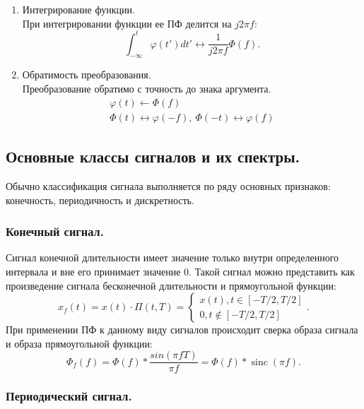 \documentclass[a4paper,14pt]{extarticle}
\DeclareMathOperator{\sinc}{sinc}
\begin{document}
\begin{enumerate}
\item Интегрирование функции. \\ При интегрировании функции ее ПФ делится на $j 2 \pi f$:
\begin{equation*}
\int_{-\infty}^{t} \varphi(t') dt' \leftrightarrow \frac{1}{j 2 \pi f} \Phi (f).
\end{equation*}

\item Обратимость преобразования. \\ Преобразование обратимо с точность до знака аргумента. 
\begin{gather*}
\varphi(t) \leftarrow \Phi (f) \\ \Phi(t) \leftrightarrow \varphi (-f), ~ \Phi(-t) \leftrightarrow \varphi(f)
\end{gather*}

\end{enumerate}  


\subsection{Основные классы сигналов и их спектры.}

Обычно классификация сигнала выполняется по ряду основных признаков: конечность, периодичность и дискретность.

\subsubsection{Конечный сигнал.}

Сигнал конечной длительности имеет значение только внутри определенного интервала и вне его принимает значение 0. Такой сигнал можно представить как произведение сигнала бесконечной длительности и прямоугольной функции:
\begin{equation*}
x_f (t) = x(t) \cdot \Pi(t, T) = \begin{cases} x(t), t \in [-T/2, T/2] \\ 0, t \notin  [-T/2, T/2] \end{cases}.
\end{equation*}
При применении ПФ к данному виду сигналов происходит сверка образа сигнала и образа прямоугольной функции:
\begin{equation*}
\Phi_f(f) = \Phi(f) * \frac{sin(\pi f T)}{\pi f} = \Phi(f) * \sinc(\pi f).
\end{equation*}

\subsubsection{Периодический сигнал.}
\end{document}
